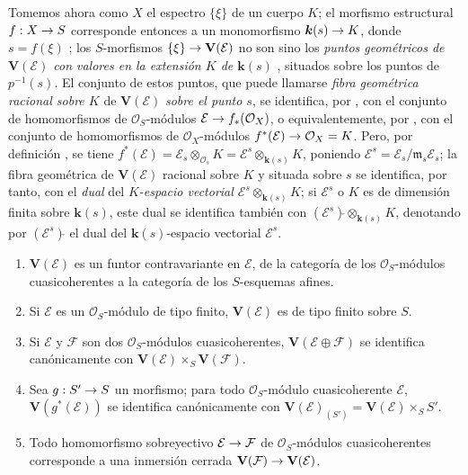 \documentclass[oneside,10pt]{amsart}
\makeatletter
\newcommand{\ega@arrow}[2]{\mathchoice{#1}{#2}{#2}{#2}}
\renewcommand{\to}{\ega@arrow{\longrightarrow}{\rightarrow}}
\let\EGAOriginalLabel\label
\renewcommand{\label}[1]{\phantomsection\EGAOriginalLabel{#1}}
\makeatother
\begin{document}
\begin{env}[1.7.10]
\label{II.1.7.10-fr}
Tomemos ahora como $X$ el espectro $\{\xi\}$ de un cuerpo $K$; el morfismo estructural $f:X\to S$ corresponde entonces a un monomorfismo $\boldsymbol{k}(s)\to K$, donde $s=f(\xi)$ ; los $S$-morfismos $\{\xi\}\to\mathbf{V}(\mathcal{E})$ no son sino los \emph{puntos geométricos de $\mathbf{V}(\mathcal{E})$ con valores en la extensión $K$ de $\boldsymbol{k}(s)$} , situados sobre los puntos de $p^{-1}(s)$.
El conjunto de estos puntos, que puede llamarse \emph{fibra geométrica racional sobre $K$} de $\mathbf{V}(\mathcal{E})$ \emph{sobre el punto $s$}, se identifica, por , con el conjunto de homomorfismos de $\mathcal{O}_S$-módulos $\mathcal{E}\to f_*(\mathcal{O}_X)$, o equivalentemente, por , con el conjunto de homomorfismos de $\mathcal{O}_X$-módulos $f^*(\mathcal{E})\to\mathcal{O}_X=K$.
Pero, por definición , se tiene
$f^*(\mathcal{E})=\mathcal{E}_s\otimes_{\mathcal{O}_s}K
=\mathcal{E}^s\otimes_{\boldsymbol{k}(s)}K$, poniendo $\mathcal{E}^s=\mathcal{E}_s/\mathfrak{m}_s\mathcal{E}_s$;
la fibra geométrica de $\mathbf{V}(\mathcal{E})$ racional sobre $K$ y situada sobre $s$ se identifica, por tanto, con el \emph{dual} del \emph{$K$-espacio vectorial $\mathcal{E}^s\otimes_{\boldsymbol{k}(s)}K$}; si $\mathcal{E}^s$ o $K$ es de dimensión finita sobre $\boldsymbol{k}(s)$, este dual se identifica también con $(\mathcal{E}^s)\check{}\otimes_{\boldsymbol{k}(s)}K$, denotando por $(\mathcal{E}^s)\check{}$ el dual del $\boldsymbol{k}(s)$-espacio vectorial $\mathcal{E}^s$.
\end{env}

\begin{proposition}[1.7.11]
\label{II.1.7.11-fr}
\medskip\noindent
\begin{enumerate}
  \item[{\rm(i)}] $\mathbf{V}(\mathcal{E})$ es un funtor contravariante en $\mathcal{E}$, de la categoría de los $\mathcal{O}_S$-módulos cuasicoherentes a la categoría de los $S$-esquemas afines.
  \item[{\rm(ii)}] Si $\mathcal{E}$ es un $\mathcal{O}_S$-módulo de tipo finito, $\mathbf{V}(\mathcal{E})$ es de tipo finito sobre $S$.
  \item[{\rm(iii)}] Si $\mathcal{E}$ y $\mathcal{F}$ son dos $\mathcal{O}_S$-módulos cuasicoherentes, $\mathbf{V}(\mathcal{E}\oplus\mathcal{F})$ se identifica canónicamente con $\mathbf{V}(\mathcal{E})\times_S\mathbf{V}(\mathcal{F})$.
  \item[{\rm(iv)}] Sea $g:S'\to S$ un morfismo; para todo $\mathcal{O}_S$-módulo cuasicoherente $\mathcal{E}$, $\mathbf{V}(g^*(\mathcal{E}))$ se identifica canónicamente con $\mathbf{V}(\mathcal{E})_{(S')}
    =\mathbf{V}(\mathcal{E})\times_S S'$.
  \item[{\rm(v)}] Todo homomorfismo sobreyectivo $\mathcal{E}\to\mathcal{F}$ de $\mathcal{O}_S$-módulos cuasicoherentes corresponde a una inmersión cerrada $\mathbf{V}(\mathcal{F})\to\mathbf{V}(\mathcal{E})$.
\end{enumerate}
\end{proposition}
\end{document}
